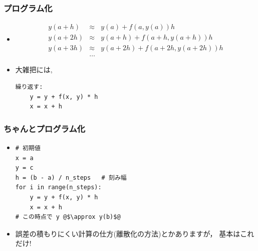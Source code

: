 \documentclass[12pt,dvipdfmx]{beamer}
\begin{document}
\begin{frame}[fragile]
\frametitle{プログラム化}
\begin{itemize}
\item []
  \begin{eqnarray*}
    y(a+h) & \approx & y(a) + f(a, y(a)) h \\
    y(a+2h) & \approx & y(a+h) + f(a+h, y(a+h)) h \\
    y(a+3h) & \approx & y(a+2h) + f(a+2h, y(a+2h)) h \\
    & \ldots & 
  \end{eqnarray*}
\item 大雑把には,
\begin{lstlisting}
繰り返す:
    y = y + f(x, y) * h
    x = x + h
\end{lstlisting}
\end{itemize}
\end{frame}

\begin{frame}[fragile]
\frametitle{ちゃんとプログラム化}
\begin{itemize}
\item []

\begin{lstlisting}
# 初期値    
x = a
y = c
h = (b - a) / n_steps   # 刻み幅
for i in range(n_steps):
    y = y + f(x, y) * h
    x = x + h
# この時点で y @$\approx y(b)$@
\end{lstlisting}

\item 誤差の積もりにくい計算の仕方(離散化の方法)とかありますが，
  基本はこれだけ!
\end{itemize}
\end{frame}
\end{document}
